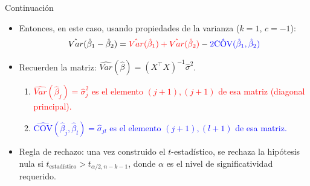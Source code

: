 \documentclass{beamer}
\begin{document}
\begin{frame}[shrink=10]{Continuación}
    \begin{itemize}
        \item Entonces, en este caso, usando propiedades de la varianza ($k = 1$, $c = -1$):
        \[\hat{Var}(\hat{\beta}_1 - \hat{\beta}_2) = \textcolor{red}{\hat{Var}(\hat{\beta}_1) + \hat{Var}(\hat{\beta}_2)} - \textcolor{blue}{2\hat{\text{COV}}(\hat{\beta}_1, \hat{\beta}_2)}\]
        \item Recuerden la matriz: $\hat{Var}(\hat{\beta})= (X^{\top}X)^{-1}\hat{\sigma}^2$.
        \begin{enumerate}
            \item \textcolor{red}{$\hat{Var}(\hat{\beta}_j) = \hat{\sigma}^2_{j}$ es el elemento $(j + 1), (j + 1)$ de esa matriz (diagonal principal).}
            \item \textcolor{blue}{$\hat{\text{COV}}(\hat{\beta}_j, \hat{\beta}_l) = \hat{\sigma}_{jl}$ es el elemento $(j + 1), (l + 1)$ de esa matriz.}
        \end{enumerate}
        \item Regla de rechazo: una vez construido el $t$-estadístico, se rechaza la hipótesis nula si $t_{\text{estadístico}} > t_{\alpha/2,n-k-1}$, donde $\alpha$ es el nivel de significatividad requerido.
    \end{itemize}
\end{frame}
\end{document}
